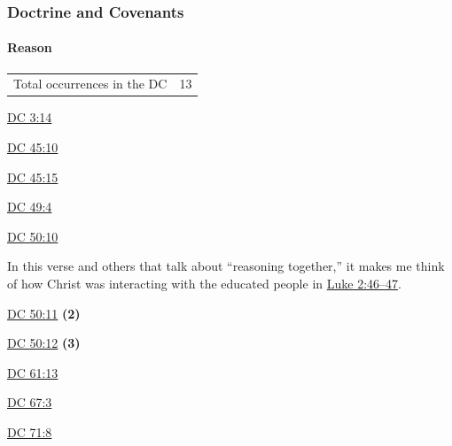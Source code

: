 	
		
		
	\subsubsection{Doctrine and Covenants} %
		\label{REASON-DC}
		
		\paragraph{Reason}
	
			\begin{tabular}{ll}
				Total occurrences in the DC & 13
			\end{tabular}
			
			\begin{compactdesc}
				\item[{\hyperref[DC3-14]{DC 3:14}}]
				\item[{\hyperref[DC45-10]{DC 45:10}}]
				\item[{\hyperref[DC45-15]{DC 45:15}}]
				\item[{\hyperref[DC49-4]{DC 49:4}}]
				\item[{\hyperref[DC50-10]{DC 50:10}}]
					\begin{compactitem}
						\item In this verse and others that talk about ``reasoning together,'' it makes me think of how Christ was interacting with the educated people in \hyperref[LUKE-2-46]{Luke 2:46--47}.
					\end{compactitem}
				\item[{\hyperref[DC50-11]{DC 50:11}}] \textbf{(2)}
				\item[{\hyperref[DC50-12]{DC 50:12}}] \textbf{(3)}
				\item[{\hyperref[DC61-13]{DC 61:13}}]
				\item[{\hyperref[DC67-3]{DC 67:3}}]
				\item[{\hyperref[DC71-8]{DC 71:8}}]
			\end{compactdesc}
			
